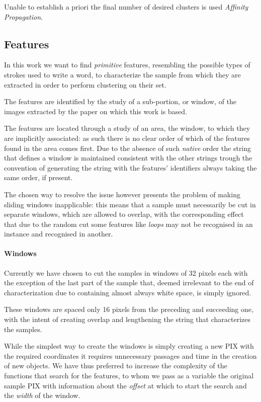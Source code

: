 \documentclass[a4paper,12pt]{article}
\begin{document}
Unable to establish a priori the final number of desired clusters is used \emph{Affinity Propagation}.

\subsection{Features}



In this work we want to find \emph{primitive} features, resembling the possible types of strokes used to write a word, to characterize the sample from which they are extracted in order to perform clustering on their set.

The features are identified by the study of a sub-portion, or window, of the images extracted by the paper on which this work is based.

The features are located through a study of an area, the window, to which they are implicitly associated: as such there is no clear order of which of the features found in the area comes first.
Due to the absence of such \emph{native} order the string that defines a window is maintained consistent with the other strings trough the convention of generating the string with the features' identifiers always taking the same order, if present.

The chosen way to resolve the issue however presents the problem of making sliding windows inapplicable: this means that a sample must necessarily be cut in separate windows, which are allowed to overlap, with the corresponding effect that due to the random cut some features like \textit{loops} may not be recognised in an instance and recognised in another. 

\paragraph{Windows}

Currently we have chosen to cut the samples in windows of 32 pixels each with the exception of the last part of the sample that, deemed irrelevant to the end of characterization due to containing almost always white space, is simply ignored.

These windows are spaced only 16 pixels from the preceding and succeeding one, with the intent of creating overlap and lengthening the string that characterizes the samples.

While the simplest way to create the windows is simply creating a new PIX with the required coordinates it requires unnecessary passages and time in the creation of new objects. We have thus preferred to increase the complexity of the functions that search for the features, to whom we pass as a variable the original sample PIX with information about the \textit{offset} at which to start the search and the \textit{width} of the window.
\end{document}
